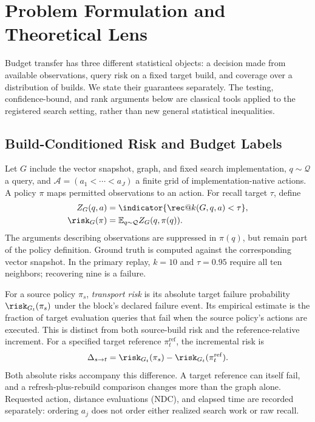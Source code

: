 \section{Problem Formulation and Theoretical Lens}
\label{sec:theory}

Budget transfer has three different statistical objects: a decision made from available observations, query risk on a fixed target build, and coverage over a distribution of builds. We state their guarantees separately. The testing, confidence-bound, and rank arguments below are classical tools applied to the registered search setting, rather than new general statistical inequalities.

\subsection{Build-Conditioned Risk and Budget Labels}

Let $G$ include the vector snapshot, graph, and fixed search implementation, $q\sim\mathcal{Q}$ a query, and $\mathcal{A}=(a_1<\cdots<a_J)$ a finite grid of implementation-native actions. A policy $\pi$ maps permitted observations to an action. For recall target $\tau$, define
\begin{equation}
 \begin{aligned}
 Z_G(q,a)&=\indicator\{\rec@k(G,q,a)<\tau\},\\
 \risk_G(\pi)&=\mathbb{E}_{q\sim\mathcal{Q}}Z_G(q,\pi(q)).
 \end{aligned}
 \label{eq:risk}
\end{equation}
The arguments describing observations are suppressed in $\pi(q)$, but remain part of the policy definition. Ground truth is computed against the corresponding vector snapshot. In the primary replay, $k=10$ and $\tau=0.95$ require all ten neighbors; recovering nine is a failure.

For a source policy $\pi_s$, \emph{transport risk} is its absolute target failure probability $\risk_{G_t}(\pi_s)$ under the block's declared failure event. Its empirical estimate is the fraction of target evaluation queries that fail when the source policy's actions are executed. This is distinct from both source-build risk and the reference-relative increment. For a specified target reference $\pi_t^{\mathrm{ref}}$, the incremental risk is
\begin{equation}
 \Delta_{s\to t}=\risk_{G_t}(\pi_s)-\risk_{G_t}(\pi_t^{\mathrm{ref}}).
 \label{eq:increment}
\end{equation}
Both absolute risks accompany this difference. A target reference can itself fail, and a refresh-plus-rebuild comparison changes more than the graph alone. Requested action, distance evaluations (NDC), and elapsed time are recorded separately: ordering $a_j$ does not order either realized search work or raw recall.

